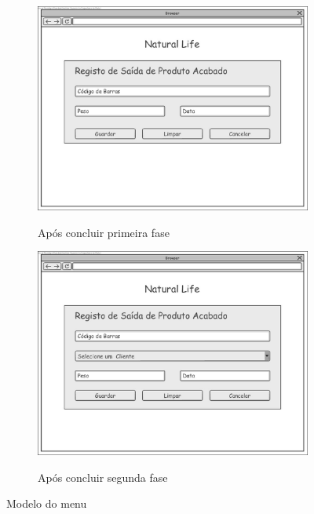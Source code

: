 \begin{figure}[H]
	\centering
	
	\begin{subfigure}[t]{0.45\linewidth}
		\includegraphics[width=\linewidth]{figuras/Diagramas_vp/DI_Fabrica_5_Saida_de_Produto_Acabado_1_Fase.jpg}
		\label{fig:di_saida_prod_acabado_1}
		\caption{Após concluir primeira fase}
	\end{subfigure}
	\begin{subfigure}[t]{0.45\linewidth}
		\includegraphics[width=\linewidth]{figuras/Diagramas_vp/DI_Fabrica_5_Saida_de_Produto_Acabado_2_Fase.jpg}
		\label{fig:di_saida_prod_acabado_2}
		\caption{Após concluir segunda fase}
	\end{subfigure}
	
	\caption{Modelo do menu}
	\label{fig:di_saida_prod_acabado}
\end{figure}

